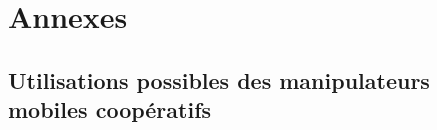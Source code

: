 \documentclass[french]{beamer}
\begin{document}
\appendix
\section*{Annexes}
\frame{\tableofcontents}

\subsection{Utilisations possibles des manipulateurs mobiles coopératifs}




%
\end{document}

